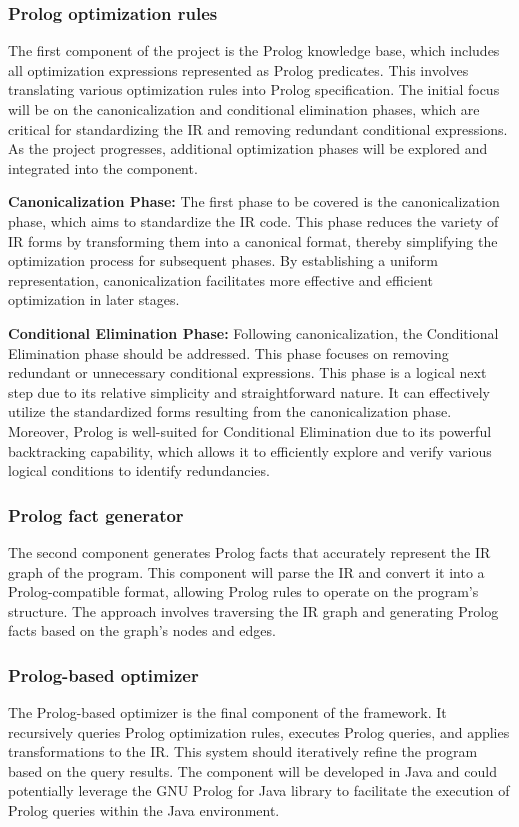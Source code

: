 \subsubsection{Prolog optimization rules}
The first component of the project is the Prolog knowledge base, which includes all optimization expressions represented as Prolog predicates. This involves translating various optimization rules into Prolog specification. The initial focus will be on the canonicalization and conditional elimination phases, which are critical for standardizing the IR and removing redundant conditional expressions. As the project progresses, additional optimization phases will be explored and integrated into the component.
\newpage
\begin{description}
    \item \textbf{Canonicalization Phase:} The first phase to be covered is the canonicalization phase, which aims to standardize the IR code. This phase reduces the variety of IR forms by transforming them into a canonical format, thereby simplifying the optimization process for subsequent phases. By establishing a uniform representation, canonicalization facilitates more effective and efficient optimization in later stages.
    \item \textbf{Conditional Elimination Phase:} Following canonicalization, the Conditional Elimination phase should be addressed. This phase focuses on removing redundant or unnecessary conditional expressions. This phase is a logical next step due to its relative simplicity and straightforward nature. It can effectively utilize the standardized forms resulting from the canonicalization phase. Moreover, Prolog is well-suited for Conditional Elimination due to its powerful backtracking capability, which allows it to efficiently explore and verify various logical conditions to identify redundancies.
\end{description}

\subsubsection{Prolog fact generator}
The second component generates Prolog facts that accurately represent the IR graph of the program. This component will parse the IR and convert it into a Prolog-compatible format, allowing Prolog rules to operate on the program's structure. The approach involves traversing the IR graph and generating Prolog facts based on the graph's nodes and edges.

\subsubsection{Prolog-based optimizer}
The Prolog-based optimizer is the final component of the framework. It recursively queries Prolog optimization rules, executes Prolog queries, and applies transformations to the IR. This system should iteratively refine the program based on the query results. The component will be developed in Java and could potentially leverage the GNU Prolog for Java library to facilitate the execution of Prolog queries within the Java environment. 

